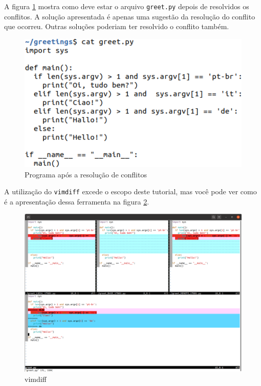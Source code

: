 \documentclass[a4paper]{book}
\begin{document}
A figura \ref{fig:56} mostra como deve estar o
arquivo \texttt{greet.py} depois de resolvidos os conflitos.
A solução apresentada é apenas uma sugestão da
resolução do conflito que ocorreu.
Outras soluções poderiam ter resolvido o conflito 
também.

\begin{figure}[!ht]
\caption{Programa após a resolução de conflitos}
\label{fig:56}
\centering
\includegraphics[scale=0.6,left]{"images/56-Programa após a resolução de conflitos.png"}
\end{figure}

A utilização do \texttt{vimdiff} excede o escopo deste 
tutorial, mas você pode ver como é a apresentação dessa 
ferramenta na figura \ref{fig:57}.

\begin{figure}[!h]
\caption{vimdiff}
\label{fig:57}
\centering
\includegraphics[scale=0.31]{"images/57-vimdiff.png"}
\end{figure}
\end{document}
